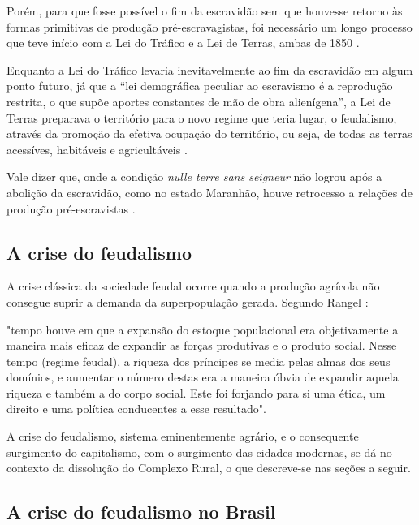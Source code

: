 \documentclass[
	12pt,				%
	oneside,			%
	a4paper,			%
	chapter=TITLE,		%
	section=TITLE,		%
	english,			%
	brazil				%
	]{abntex2}
\begin{document}
Porém, para que fosse possível o fim da escravidão sem que houvesse
retorno às formas primitivas de produção pré-escravagistas, foi
necessário um longo processo que teve início com a Lei do Tráfico e a
Lei de Terras, ambas de 1850 \autocite[732]{rangel1989}.

Enquanto a Lei do Tráfico levaria inevitavelmente ao fim da escravidão
em algum ponto futuro, já que a ``lei demográfica peculiar ao escravismo
é a reprodução restrita, o que supõe aportes constantes de mão de obra
alienígena'', a Lei de Terras preparava o território para o novo regime
que teria lugar, o feudalismo, através da promoção da efetiva ocupação
do território, ou seja, de todas as terras acessíves, habitáveis e
agricultáveis \autocite[732-733]{rangel1989}.

Vale dizer que, onde a condição \emph{nulle terre sans seigneur} não
logrou após a abolição da escravidão, como no estado Maranhão, houve
retrocesso a relações de produção pré-escravistas
\autocite[733-734]{rangel1989}.

\subsection{A crise do feudalismo}\label{a-crise-do-feudalismo}

A crise clássica da sociedade feudal ocorre quando a produção agrícola
não consegue suprir a demanda da superpopulação gerada. Segundo Rangel
\autocite*[219]{rangel1961}:
\begin{citacao} 
"tempo houve em que a expansão do estoque populacional era objetivamente a
maneira mais eficaz de expandir as forças produtivas e o produto social. Nesse
tempo (regime feudal), a riqueza dos príncipes se media pelas almas dos seus
domínios, e aumentar o número destas era a maneira óbvia de expandir aquela
riqueza e também a do corpo social. Este foi forjando para si uma ética, um
direito e uma política conducentes a esse resultado".
\end{citacao}
A crise do feudalismo, sistema eminentemente agrário, e o consequente
surgimento do capitalismo, com o surgimento das cidades modernas, se dá
no contexto da dissolução do Complexo Rural, o que descreve-se nas
seções a seguir.

\subsection{A crise do feudalismo no
Brasil}\label{a-crise-do-feudalismo-no-brasil}
\end{document}

